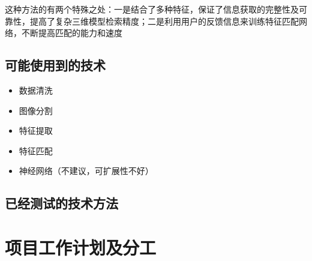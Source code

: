 \documentclass{article}
\begin{document}
这种方法的有两个特殊之处：一是结合了多种特征，保证了信息获取的完整性及可靠性，提高了复杂三维模型检索精度；二是利用用户的反馈信息来训练特征匹配网络，不断提高匹配的能力和速度
\subsection{可能使用到的技术}
\begin{itemize}
    \item 数据清洗
    \item 图像分割
    \item 特征提取
    \item 特征匹配
    \item 神经网络（不建议，可扩展性不好）
\end{itemize}
\subsection{已经测试的技术方法}

\section{项目工作计划及分工}
\end{document}
